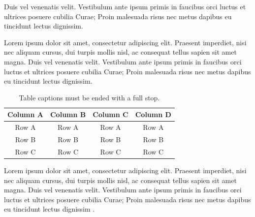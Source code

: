 Duis vel venenatis velit. Vestibulum ante ipsum primis in faucibus orci 
luctus et ultrices posuere cubilia Curae; Proin malesuada risus nec metus dapibus 
eu tincidunt lectus dignissim.

Lorem ipsum dolor sit amet, consectetur adipiscing elit. Praesent imperdiet, nisi 
nec aliquam cursus, dui turpis mollis nisl, ac consequat tellus sapien sit amet 
magna. Duis vel venenatis velit. Vestibulum ante ipsum primis in faucibus orci 
luctus et ultrices posuere cubilia Curae; Proin malesuada risus nec metus dapibus 
eu tincidunt lectus dignissim.

\begin{table}
{\setlength{\tabcolsep}{14pt}
\caption{Table captions must be ended with a full stop.}
\begin{center}
\vspace{-6mm}
\begin{tabular}{cccc}
\hline\hline
Column A & Column B & Column C & Column D \\
\hline
Row A & Row A & Row A & Row A \\
Row B & Row B & Row B & Row B \\
Row C & Row C & Row C & Row C \\
\hline
\end{tabular}
\vspace{-6mm}
\end{center}
\label{sitable3}}
\end{table}

Lorem ipsum dolor sit amet, consectetur adipiscing elit. Praesent imperdiet, nisi 
nec aliquam cursus, dui turpis mollis nisl, ac consequat tellus sapien sit amet 
magna. Duis vel venenatis velit. Vestibulum ante ipsum primis in faucibus orci 
luctus et ultrices posuere cubilia Curae; Proin malesuada risus nec metus dapibus 
eu tincidunt lectus dignissim \cite{1993JHyd..144..193B}.


